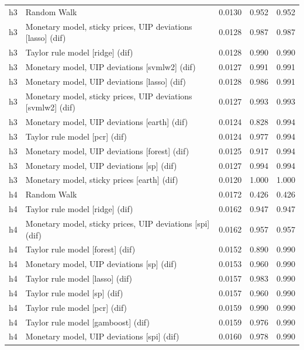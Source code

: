 \begin{ThreePartTable}
\begin{longtable}[t]{cp{5.5cm}ccc}
\addlinespace
h3 & \raggedright Random Walk & 0.0130 & 0.952 & 0.952\\
h3 & \raggedright Monetary model, sticky prices, UIP deviations [lasso] (dif) & 0.0128 & 0.987 & 0.987\\
h3 & \raggedright Taylor rule model [ridge] (dif) & 0.0128 & 0.990 & 0.990\\
h3 & \raggedright Monetary model, UIP deviations [svmlw2] (dif) & 0.0127 & 0.991 & 0.991\\
h3 & \raggedright Monetary model, UIP deviations [lasso] (dif) & 0.0128 & 0.986 & 0.991\\
h3 & \raggedright Monetary model, sticky prices, UIP deviations [svmlw2] (dif) & 0.0127 & 0.993 & 0.993\\
h3 & \raggedright Monetary model, UIP deviations [earth] (dif) & 0.0124 & 0.828 & 0.994\\
h3 & \raggedright Taylor rule model [pcr] (dif) & 0.0124 & 0.977 & 0.994\\
h3 & \raggedright Monetary model, UIP deviations [forest] (dif) & 0.0125 & 0.917 & 0.994\\
h3 & \raggedright Monetary model, UIP deviations [sp] (dif) & 0.0127 & 0.994 & 0.994\\
h3 & \raggedright Monetary model, sticky prices [earth] (dif) & 0.0120 & 1.000 & 1.000\\
\addlinespace
h4 & \raggedright Random Walk & 0.0172 & 0.426 & 0.426\\
h4 & \raggedright Taylor rule model [ridge] (dif) & 0.0162 & 0.947 & 0.947\\
h4 & \raggedright Monetary model, sticky prices, UIP deviations [spi] (dif) & 0.0162 & 0.957 & 0.957\\
h4 & \raggedright Taylor rule model [forest] (dif) & 0.0152 & 0.890 & 0.990\\
h4 & \raggedright Monetary model, UIP deviations [sp] (dif) & 0.0153 & 0.960 & 0.990\\
h4 & \raggedright Taylor rule model [lasso] (dif) & 0.0157 & 0.983 & 0.990\\
h4 & \raggedright Taylor rule model [sp] (dif) & 0.0157 & 0.960 & 0.990\\
h4 & \raggedright Taylor rule model [pcr] (dif) & 0.0159 & 0.990 & 0.990\\
h4 & \raggedright Taylor rule model [gamboost] (dif) & 0.0159 & 0.976 & 0.990\\
h4 & \raggedright Monetary model, UIP deviations [spi] (dif) & 0.0160 & 0.978 & 0.990\\

\end{longtable}
\end{ThreePartTable}
